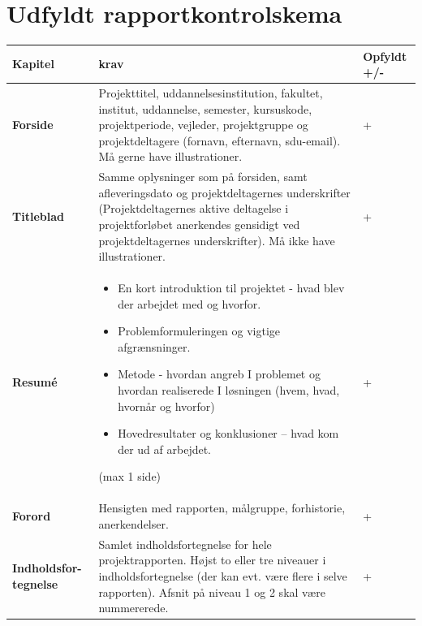 \clearpage
\section{Udfyldt rapportkontrolskema}


\begin{longtable}{|p{30mm}|p{90mm}|p{25mm}|}
\hline
\textbf{Kapitel}    & \textbf{krav}     & \textbf{Opfyldt +/-} \\ \hline

\textbf{Forside}    & Projekttitel, uddannelsesinstitution, fakultet, institut, uddannelse, semester, kursuskode, projektperiode, vejleder, projektgruppe og projektdeltagere (fornavn, efternavn, sdu-email). Må gerne have illustrationer.
                                &     +       \\ \hline
                                        
\textbf{Titleblad}  & Samme oplysninger som på forsiden, samt afleveringsdato og projektdeltagernes underskrifter (Projektdeltagernes aktive deltagelse i projektforløbet anerkendes gensidigt ved projektdeltagernes underskrifter). Må ikke have illustrationer.
                                &    +        \\ \hline
                                        
\textbf{Resumé}     & \begin{itemize}
                        \item En kort introduktion til projektet - hvad blev der arbejdet med og hvorfor.
                        \item Problemformuleringen og vigtige afgrænsninger.
                        \item Metode - hvordan angreb I problemet og hvordan realiserede I løsningen (hvem, hvad, hvornår og hvorfor)
                        \item Hovedresultater og konklusioner  – hvad kom der ud af arbejdet.
                    \end{itemize}
                        (max 1 side)
                                &    +        \\ \hline

\textbf{Forord}     & Hensigten med rapporten, målgruppe, forhistorie, anerkendelser.
                                &    +        \\ \hline

\textbf{Indholdsfor-tegnelse}    & Samlet indholdsfortegnelse for hele projektrapporten. 
Højst to eller tre niveauer i indholdsfortegnelse (der kan evt. være flere i selve rapporten). Afsnit på niveau 1 og 2 skal være nummererede.
                                &   +         \\ \hline


\end{longtable}
